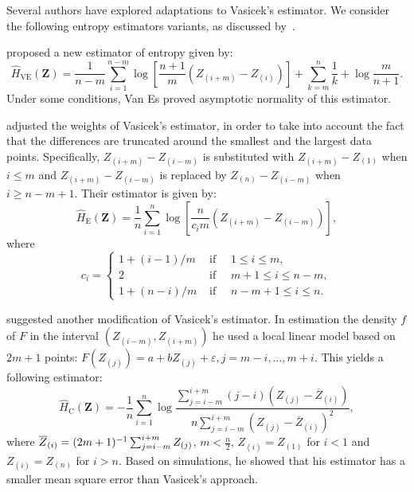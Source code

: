 Several authors have explored adaptations  to Vasicek's estimator. We consider the following entropy estimators variants, as discussed by~\citep{AlOmari2016,Cassetti2022}.

\citet{Bert1992} proposed a new estimator of entropy given by:
 \begin{equation}
\label{E:VanEs}
	\widehat{H}_{\text{VE}}(\bm{Z})=\frac{1}{n-m}\sum_{i=1}^{n-m}\log\left[\frac{n+1}{m}\left(Z_{(i+m)}-Z_{(i)}\right)\right]	+\sum_{k=m}^n\frac{1}{k}+\log\frac{m}{n+1}.
\end{equation}
Under some conditions, Van Es proved asymptotic normality of this estimator.

\citet{Ebrahimi1994} adjusted the weights of Vasicek's estimator, in order to take into account the fact that the differences are truncated around the smallest and the largest data points.
 Specifically, $Z_{(i+m)}-Z_{(i-m)}$ is substituted with  $Z_{(i+m)}-Z_{(1)}$ when $i \leq m$ and $Z_{(i+m)}-Z_{(i-m)}$ is replaced by $Z_{(n)}-Z_{(i-m)}$ when $i \geq n-m+1$. Their estimator is given by:
  \begin{equation}
	\label{E:Ebrahimi}
  \widehat{H}_{\text{E}}(\bm{Z})=\frac{1}{n} \sum_{i=1}^n \log \left[\frac{n}{c_i m}\left(Z_{(i+m)}-Z_{(i-m)}\right)\right],
  \end{equation} where \[
  c_i=\begin{cases}1+(i-1) / m & \text { if } \quad 1 \leq i \leq m, \\ 2 & \text { if }\quad m+1 \leq i \leq n-m,\\ 1+(n-i) / m & \text { if }\quad n-m+1 \leq i \leq n.\end{cases}
  \]

 \citet{correa1995new} suggested another modification of Vasicek's estimator. 
In estimation the density $f$ of $F$ in the interval $\left(Z_{(i-m)}, Z_{(i+m)}\right)$ he used a local linear model based on $2 m+1$ points: $F\left(Z_{(j)}\right)=a+b Z_{(j)}+\varepsilon, j=m-i, \ldots, m+i$. This yields a following estimator:
  \begin{equation}
	\label{E:Correa}
  \widehat{H}_{\text{C}}(\bm{Z})=-\frac{1}{n} \sum_{i=1}^n \log \frac{\sum_{j=i-m}^{i+m}(j-i)\left(Z_{(j)}-\overline{Z}_{(i)}\right)}{n\sum_{j=i-m}^{i+m}\left(Z_{(j)}-\overline{Z}_{(i)}\right)^2},
  \end{equation} where
  \(\overline{Z}_{(i)}=(2 m+1)^{-1} \sum_{j=i-m}^{i+m} Z_{(j)}\),
  \(m< \frac{n}{2}\), \(Z_{(i)}=Z_{(1)}\) for \(i<1\) and
  \(Z_{(i)}=Z_{(n)}\) for \(i>n\). Based on simulations, he showed that
  his estimator has a smaller mean square error than Vasicek's approach.
	
